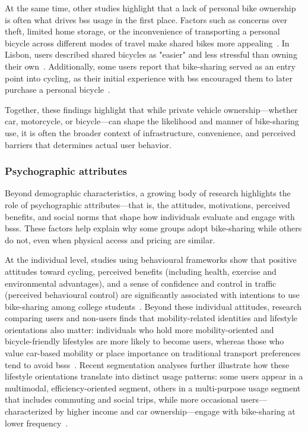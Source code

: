     At the same time, other studies highlight that a lack of personal bike ownership is often what drives \ac{bss} usage in the first place. Factors such as concerns over theft, limited home storage, or the inconvenience of transporting a personal bicycle across different modes of travel make shared bikes more appealing~\cite{Teixeira2023, Ricci2015, Molina-Garcia2013, BachandMarleau2012}. In Lisbon, users described shared bicycles as "easier" and less stressful than owning their own~\cite{Teixeira2023}. Additionally, some users report that bike-sharing served as an entry point into cycling, as their initial experience with \ac{bss} encouraged them to later purchase a personal bicycle~\cite{Fishman2016}.

    Together, these findings highlight that while private vehicle ownership—whether car, motorcycle, or bicycle—can shape the likelihood and manner of bike-sharing use, it is often the broader context of infrastructure, convenience, and perceived barriers that determines actual user behavior.

    \subsubsection{Psychographic attributes}

    Beyond demographic characteristics, a growing body of research highlights the role of psychographic attributes—that is, the attitudes, motivations, perceived benefits, and social norms that shape how individuals evaluate and engage with \acp{bss}. These factors help explain why some groups adopt bike-sharing while others do not, even when physical access and pricing are similar.

    At the individual level, studies using behavioural frameworks show that positive attitudes toward cycling, perceived benefits (including health, exercise and environmental advantages), and a sense of confidence and control in traffic (perceived behavioural control) are significantly associated with intentions to use bike-sharing among college students~\cite{Chen2022_Predicting}. Beyond these individual attitudes, research comparing users and non-users finds that mobility-related identities and lifestyle orientations also matter: individuals who hold more mobility-oriented and bicycle-friendly lifestyles are more likely to become users, whereas those who value car-based mobility or place importance on traditional transport preferences tend to avoid \acp{bss}~\cite{Stockle2020}. Recent segmentation analyses further illustrate how these lifestyle orientations translate into distinct usage patterns: some users appear in a multimodal, efficiency-oriented segment, others in a multi-purpose usage segment that includes commuting and social trips, while more occasional users—characterized by higher income and car ownership—engage with bike-sharing at lower frequency~\cite{Mohiuddin2024}.

